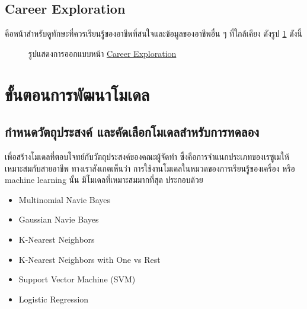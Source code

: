\subsection{Career Exploration}
คือหน้าสำหรับดูทักษะที่ควรเรียนรู้ของอาชีพที่สนใจและข้อมูลของอาชีพอื่น ๆ ที่ใกล้เคียง ดังรูป \ref{fig:CE.png} ดังนี้
\begin{figure}[H]\centering
    \caption{รูปแสดงการออกแบบหน้า \hyperref[subsec:Career Exploration]{Career Exploration}}\label{fig:CE.png}
\end{figure}

\section{ขั้นตอนการพัฒนาโมเดล}
\subsection{กำหนดวัตถุประสงค์ และคัดเลือกโมเดลสำหรับการทดลอง}
เพื่อสร้างโมเดลที่ตอบโจทย์กับวัตถุประสงค์ของคณะผู้จัดทำ ซึ่งคือการจำแนกประเภทของเรซูเมให้เหมาะสมกับสายอาชีพ ทางเราสังเกตเห็นว่า การใช้งานโมเดลในหมวดของการเรียนรู้ของเครื่อง หรือ machine learning นั้น มีโมเดลที่เหมาะสมมากที่สุด ประกอบด้วย
\begin{itemize}
    \item Multinomial Navie Bayes
    \item Gaussian Navie Bayes
    \item K-Nearest Neighbors
    \item K-Nearest Neighbors with One vs Rest
    \item Support Vector Machine (SVM)
    \item Logistic Regression
\end{itemize}

